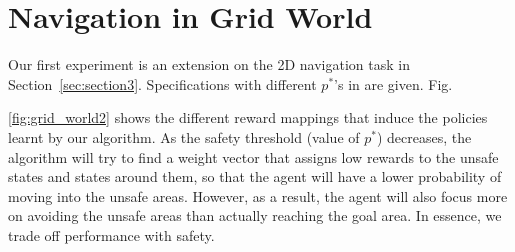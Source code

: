 \section{Navigation in Grid World}
Our first experiment is an extension on the 2D navigation task in Section~\ref{sec:section3}. Specifications with different $p^*$'s in \label{eq:spec} are given. Fig.~{\ref{fig:grid_world2} shows the different reward mappings that induce the policies learnt by our algorithm. As the safety threshold (value of $p^*$) decreases, the algorithm will try to find a weight vector that assigns low rewards to the  unsafe states and states around them, so that the agent will have a lower probability of moving into the unsafe areas. However, as a result, the agent will also focus more on avoiding the unsafe areas than actually reaching the goal area. In essence, we trade off performance with safety. 
\begin{figure}[!htb]
\centering
{}

\end{figure}}
